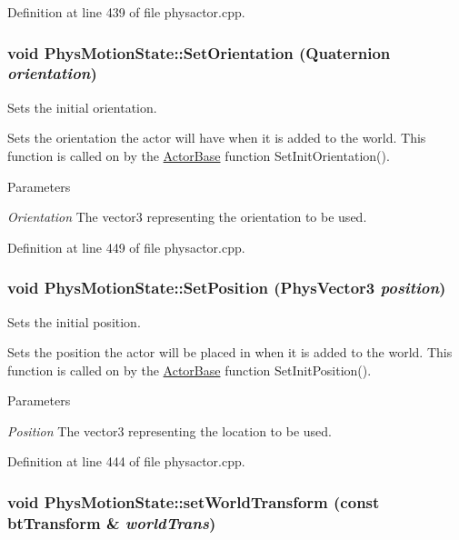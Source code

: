 Definition at line 439 of file physactor.cpp.

\hypertarget{classPhysMotionState_a3de0041d9fd078dcdea0db97a1c9e3e2}{
\subsubsection[{SetOrientation}]{\setlength{\rightskip}{0pt plus 5cm}void PhysMotionState::SetOrientation ({\bf Quaternion} {\em orientation})}}
\label{d2/d14/classPhysMotionState_a3de0041d9fd078dcdea0db97a1c9e3e2}


Sets the initial orientation. 

Sets the orientation the actor will have when it is added to the world. This function is called on by the \hyperlink{classActorBase}{ActorBase} function SetInitOrientation(). 
\begin{DoxyParams}{Parameters}
\item[{\em Orientation}]The vector3 representing the orientation to be used. \end{DoxyParams}


Definition at line 449 of file physactor.cpp.

\hypertarget{classPhysMotionState_aa2fa4f107147626cd33d42fd3fbe178b}{
\subsubsection[{SetPosition}]{\setlength{\rightskip}{0pt plus 5cm}void PhysMotionState::SetPosition ({\bf PhysVector3} {\em position})}}
\label{d2/d14/classPhysMotionState_aa2fa4f107147626cd33d42fd3fbe178b}


Sets the initial position. 

Sets the position the actor will be placed in when it is added to the world. This function is called on by the \hyperlink{classActorBase}{ActorBase} function SetInitPosition(). 
\begin{DoxyParams}{Parameters}
\item[{\em Position}]The vector3 representing the location to be used. \end{DoxyParams}


Definition at line 444 of file physactor.cpp.

\hypertarget{classPhysMotionState_a57c23b922e2c5e8af87dc1318796ec8b}{
\subsubsection[{setWorldTransform}]{\setlength{\rightskip}{0pt plus 5cm}void PhysMotionState::setWorldTransform (const btTransform \& {\em worldTrans})}}
\label{d2/d14/classPhysMotionState_a57c23b922e2c5e8af87dc1318796ec8b}


